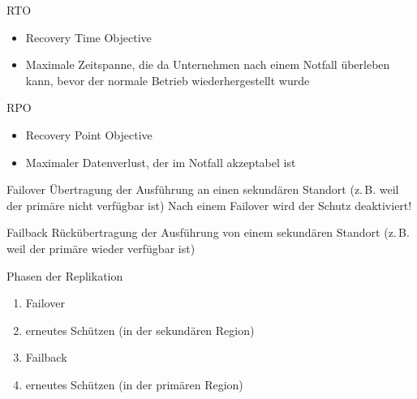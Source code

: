 \begin{flashcard}[Definition]{RTO}
    \begin{itemize}
        \item Recovery Time Objective
        \item Maximale Zeitspanne, die da Unternehmen nach einem Notfall überleben kann, bevor der normale Betrieb wiederhergestellt wurde
    \end{itemize}
\end{flashcard}

\begin{flashcard}[Definition]{RPO}
    \begin{itemize}
        \item Recovery Point Objective
        \item Maximaler Datenverlust, der im Notfall akzeptabel ist
    \end{itemize}
\end{flashcard}

\begin{flashcard}[Definition]{Failover}
    Übertragung der Ausführung an einen sekundären Standort (z.\,B. weil der primäre nicht verfügbar ist)
    \vspace{1cm}
    Nach einem Failover wird der Schutz deaktiviert!
\end{flashcard}

\begin{flashcard}[Definition]{Failback}
    Rückübertragung der Ausführung von einem sekundären Standort (z.\,B. weil der primäre wieder verfügbar ist)
\end{flashcard}

\begin{flashcard}[Definition]{Phasen der Replikation}
    \begin{enumerate}
        \item Failover
        \item erneutes Schützen (in der sekundären Region)
        \item Failback
        \item erneutes Schützen (in der primären Region)
    \end{enumerate}
\end{flashcard}


